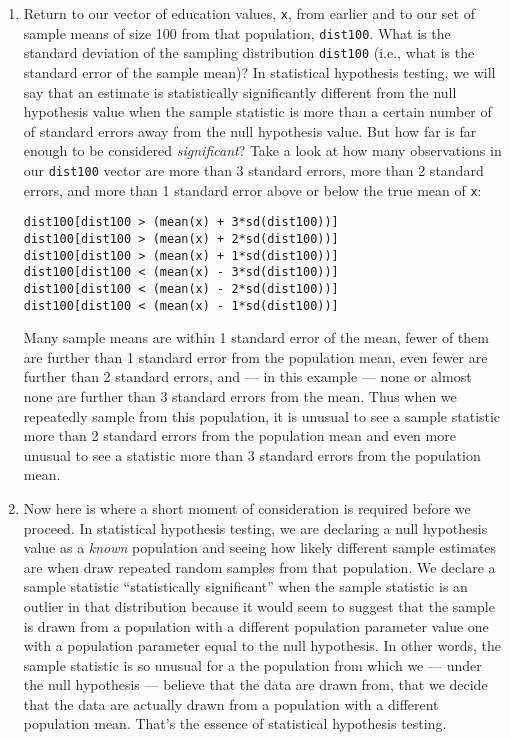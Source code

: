 \documentclass[a4paper,12pt]{article}
\begin{document}
\begin{enumerate}
\item Return to our vector of education values, \texttt{x}, from earlier and to our set of sample means of size 100 from that population, \texttt{dist100}. What is the standard deviation of the sampling distribution \texttt{dist100} (i.e., what is the standard error of the sample mean)? In statistical hypothesis testing, we will say that an estimate is statistically significantly different from the null hypothesis value when the sample statistic is more than a certain number of of standard errors away from the null hypothesis value. But how far is far enough to be considered \textit{significant}? Take a look at how many observations in our \texttt{dist100} vector are more than 3 standard errors, more than 2 standard errors, and more than 1 standard error above or below the true mean of \texttt{x}:

\begin{verbatim}
dist100[dist100 > (mean(x) + 3*sd(dist100))]
dist100[dist100 > (mean(x) + 2*sd(dist100))]
dist100[dist100 > (mean(x) + 1*sd(dist100))]
dist100[dist100 < (mean(x) - 3*sd(dist100))]
dist100[dist100 < (mean(x) - 2*sd(dist100))]
dist100[dist100 < (mean(x) - 1*sd(dist100))]
\end{verbatim}

\noindent Many sample means are within 1 standard error of the mean, fewer of them are further than 1 standard error from the population mean, even fewer are further than 2 standard errors, and --- in this example --- none or almost none are further than 3 standard errors from the mean. Thus when we repeatedly sample from this population, it is unusual to see a sample statistic more than 2 standard errors from the population mean and even more unusual to see a statistic more than 3 standard errors from the population mean.

\item Now here is where a short moment of consideration is required before we proceed. In statistical hypothesis testing, we are declaring a null hypothesis value as a \textit{known} population and seeing how likely different sample estimates are when draw repeated random samples from that population. We declare a sample statistic ``statistically significant'' when the sample statistic is an outlier in that distribution because it would seem to suggest that the sample is drawn from a population with a different population parameter value one with a population parameter equal to the null hypothesis. In other words, the sample statistic is so unusual for a the population from which we --- under the null hypothesis --- believe that the data are drawn from, that we decide that the data are actually drawn from a population with a different population mean. That's the essence of statistical hypothesis testing.


\end{enumerate}
\end{document}
